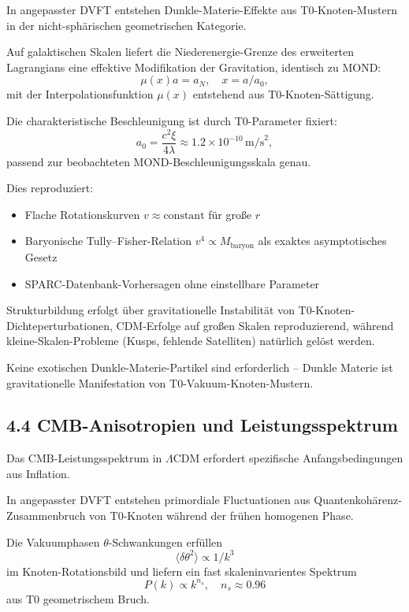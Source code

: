 \documentclass[12pt,a4paper]{article}
\begin{document}
	In angepasster DVFT entstehen Dunkle-Materie-Effekte aus T0-Knoten-Mustern in der nicht-sphärischen geometrischen Kategorie.
	
	Auf galaktischen Skalen liefert die Niederenergie-Grenze des erweiterten Lagrangians eine effektive Modifikation der Gravitation, identisch zu MOND:
	\[
	\mu(x) a = a_N, \quad x = a / a_0,
	\]
	mit der Interpolationsfunktion $\mu(x)$ entstehend aus T0-Knoten-Sättigung.
	
	Die charakteristische Beschleunigung ist durch T0-Parameter fixiert:
	\[
	a_0 = \frac{c^2 \xi}{4 \lambda} \approx 1.2 \times 10^{-10} \, \text{m/s}^2,
	\]
	passend zur beobachteten MOND-Beschleunigungsskala genau.
	
	Dies reproduziert:
	\begin{itemize}
		\item Flache Rotationskurven $v \approx \text{constant}$ für große $r$
		\item Baryonische Tully–Fisher-Relation $v^4 \propto M_{\text{baryon}}$ als exaktes asymptotisches Gesetz
		\item SPARC-Datenbank-Vorhersagen ohne einstellbare Parameter
	\end{itemize}
	
	Strukturbildung erfolgt über gravitationelle Instabilität von T0-Knoten-Dichteperturbationen, CDM-Erfolge auf großen Skalen reproduzierend, während kleine-Skalen-Probleme (Kusps, fehlende Satelliten) natürlich gelöst werden.
	
	Keine exotischen Dunkle-Materie-Partikel sind erforderlich – Dunkle Materie ist gravitationelle Manifestation von T0-Vakuum-Knoten-Mustern.
	
	\subsection{4.4 CMB-Anisotropien und Leistungsspektrum}
	
	Das CMB-Leistungsspektrum in $\Lambda$CDM erfordert spezifische Anfangsbedingungen aus Inflation.
	
	In angepasster DVFT entstehen primordiale Fluctuationen aus Quantenkohärenz-Zusammenbruch von T0-Knoten während der frühen homogenen Phase.
	
	Die Vakuumphasen $\theta$-Schwankungen erfüllen
	\[
	\langle \delta \theta^2 \rangle \propto 1/k^3
	\]
	im Knoten-Rotationsbild und liefern ein fast skaleninvarientes Spektrum
	\[
	P(k) \propto k^{n_s}, \quad n_s \approx 0.96
	\]
	aus T0 geometrischem Bruch.
	
\end{document}
